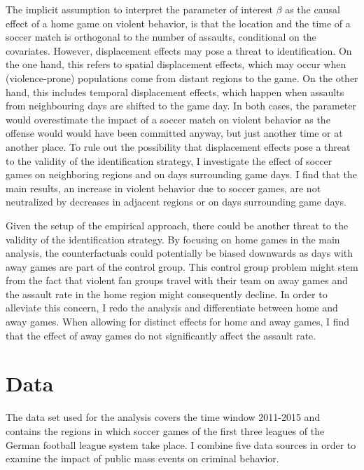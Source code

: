 \documentclass[11pt, a4paper]{article} %
\begin{document}
The implicit assumption to interpret the parameter of interest $\beta$ as the causal effect of a home game on violent behavior, is that the location and the time of a soccer match is orthogonal to the number of assaults, conditional on the covariates. However, displacement effects may pose a threat to identification. On the one hand, this refers to spatial displacement effects, which may occur when (violence-prone) populations come from distant regions to the game. On the other hand, this includes temporal displacement effects, which happen when assaults from neighbouring days are shifted to the game day. In both cases, the parameter would overestimate the impact of a soccer match on violent behavior as the offense would would have been committed anyway, but just another time or at another place. To rule out the possibility that displacement effects pose a threat to the validity of the identification strategy, I investigate the effect of soccer games on neighboring regions and on days surrounding game days. I find that the main results, an increase in violent behavior due to soccer games, are not neutralized by decreases in adjacent regions or on days surrounding game days.


Given the setup of the empirical approach, there could be another threat to the validity of the identification strategy. By focusing on home games in the main analysis, the counterfactuals could potentially be biased downwards as days with away games are part of the control group. This control group problem might stem from the fact that violent fan groups travel with their team on away games and the assault rate in the home region might consequently decline. In order to alleviate this concern, I redo the analysis and differentiate between home and away games. When allowing for distinct effects for home and away games, I find that the effect of away games do not significantly affect the assault rate. 








\bigskip
\section{Data}\label{sec_soc_ext:data} 
The data set used for the analysis covers the time window 2011-2015 and contains the regions in which soccer games of the first three leagues of the German football league system take place. I combine five data sources in order to examine the impact of public mass events on criminal behavior.
\end{document}
